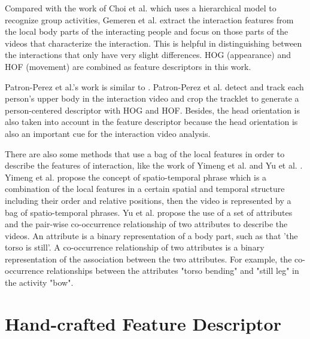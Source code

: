 \par 
Compared with the work of Choi et al. which uses a hierarchical model to recognize group activities, Gemeren et al. \cite{Gemeren2015} extract the interaction features from the local body parts of the interacting people and focus on those parts of the videos that characterize the interaction. This is helpful in distinguishing between the interactions that only have  very slight differences. HOG (appearance) and HOF (movement) are combined as feature descriptors in this work.
\par
Patron-Perez et al.'s work \cite{patron2010} is similar to \cite{Gemeren2015}. Patron-Perez et al. detect and track each person's upper body in the interaction video and crop the tracklet to generate a person-centered descriptor with HOG and HOF. Besides, the head orientation is also taken into account in the feature descriptor because the head orientation is also an important cue for the interaction video analysis.
\par
There are also some methods that use a bag of the local features in order to describe the features of interaction, like the work of Yimeng et al. \cite{yimeng} and Yu et al. \cite{yu}. Yimeng et al. propose the concept of spatio-temporal phrase which is a combination of the local features in a certain spatial and temporal structure including their order and relative positions, then the video is represented by a bag of spatio-temporal phrases. Yu et al. propose the use of a set of attributes and the pair-wise co-occurrence relationship of two attributes to describe the videos. An attribute is a binary representation of a body part, such as that 'the torso is still'. A co-occurrence relationship of two attributes is a binary representation of the association between the two attributes. For example, the co-occurrence relationships between the attributes "torso bending" and "still leg" in the activity "bow".

\section{Hand-crafted Feature Descriptor}
\label{2_2}

